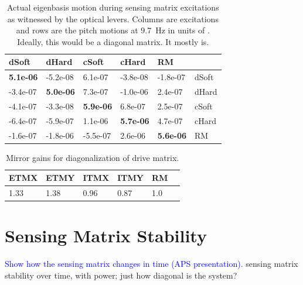 \begin{table}
\centering
\caption[Actual eigenbasis motion during sensing matrix excitations]{Actual eigenbasis motion during sensing matrix excitations as
  witnessed by the optical levers. Columns are excitations and rows are
  the pitch motions at 9.7~Hz in units of \microrad. Ideally, this
  would be a diagonal matrix. It mostly is.}
\begin{tabular}{l l l l l l}
\hline
dSoft & dHard  & cSoft & cHard & RM & \\
\hline
   \textbf{5.1e-06} & -5.2e-08  & 6.1e-07 & -3.8e-08 &  -1.8e-07 & dSoft\\
  -3.4e-07 &  \textbf{5.0e-06}  &  7.3e-07 & -1.0e-06 &  2.4e-07 & dHard\\
  -4.1e-07 & -3.3e-08 &  \textbf{5.9e-06} &  6.8e-07 &  2.5e-07 & cSoft\\
  -6.4e-07 & -5.9e-07 &  1.1e-06 &  \textbf{5.7e-06} &  4.7e-07 & cHard\\
  -1.6e-07 & -1.8e-06 & -5.5e-07 &   2.6e-06 &  \textbf{5.6e-06} & RM\\
\hline
\end{tabular}
\label{table:excitations_calibrated}
\end{table}



\begin{table}
\centering
\caption[Mirror gains for diagonalization of drive matrix]{Mirror
  gains for diagonalization of drive matrix.} 
\begin{tabular}{l l l l l l}
\hline
ETMX & ETMY & ITMX & ITMY & RM & \\
\hline
1.33 & 1.38 & 0.96 & 0.87 & 1.0 \\
\hline
\end{tabular}
\end{table}




\section{Sensing Matrix Stability}
\textcolor{blue}{Show how the sensing matrix changes in time (APS
  presentation).}
sensing matrix stability over time, with power;
just how diagonal is the system?

